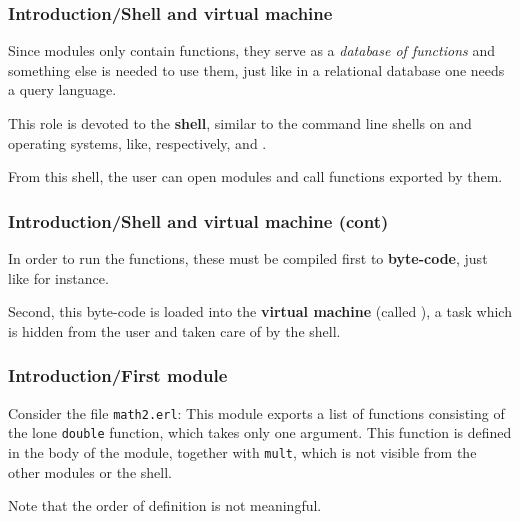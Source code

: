 %
\begin{frame}
\frametitle{Introduction/Shell and virtual machine}

Since \Erlang modules only contain functions, they serve as a
\emph{database of functions} and something else is needed to use them,
just like in a relational database one needs a query language.

\bigskip

This role is devoted to the \textbf{\Erlang shell}, similar to the
command line shells on \Unix and \Windows operating systems, like,
respectively, \Bash and \DOS.

\bigskip

From this shell, the user can open modules and call functions exported
by them. 

\end{frame}

%
\begin{frame}
\frametitle{Introduction/Shell and virtual machine (cont)}

In order to run the functions, these must be compiled first
to \textbf{byte-code}, just like \Java for instance. 

\bigskip

Second, this byte-code is loaded into the \textbf{\Erlang virtual
  machine} (called \textbf{\BEAM}), a task which is hidden from the
user and taken care of by the \Erlang shell.

\end{frame}

%
\begin{frame}
\frametitle{Introduction/First module}

Consider the file \texttt{math2.erl}:
This module exports a list of functions consisting of the lone
\texttt{double} function, which takes only one argument. This function
is defined in the body of the module, together with \texttt{mult},
which is not visible from the other modules or the \Erlang shell. 

\bigskip

Note that the order of definition is not meaningful.

\end{frame}

